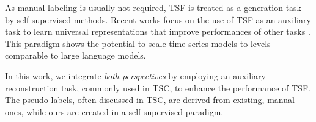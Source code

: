 As manual labeling is usually not required, TSF is treated as a generation task by self-supervised methods.
Recent works focus on the use of TSF as an auxiliary task to learn universal representations that improve performances of other tasks \citep{patchtst, selfdiff, timesurl}. This paradigm shows the potential to scale time series models to levels comparable to large language models. 

In this work, we integrate \emph{both perspectives} by employing an auxiliary reconstruction task, commonly used in TSC, to enhance the performance of TSF. 
The pseudo labels, often discussed in TSC, are derived from existing, manual ones, while ours are created in a self-supervised paradigm.